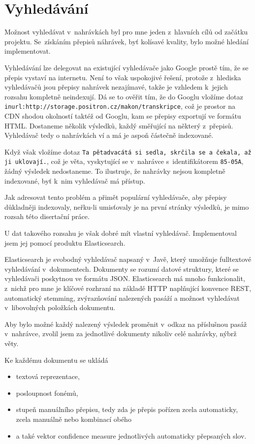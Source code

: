 \chapter{Vyhledávání}
\label{kap:vyhledavani}

Možnost vyhledávat v~nahrávkách byl pro mne jeden z~hlavních cílů od začátku
projektu. Se~získáním přepisů náhrávek, byť kolísavé kvality, bylo možné hledání
implementovat.

Vyhledávání lze delegovat na existující vyhledávače jako Google
prostě tím, že se přepis vystaví na internetu. Není to však uspokojivé řešení,
protože z~hlediska vyhledávačů jsou přepisy nahrávek nezajímavé, takže je
vzhledem k~jejich rozsahu kompletně neindexují. Dá se to ověřit tím, že do
Googlu vložíme dotaz
\texttt{inurl:http://storage.positron.cz/makon/transkripce}, což je prostor na
CDN shodou okolností taktéž od Googlu, kam se přepisy exportují ve formátu HTML.
Dostaneme několik výsledků, každý směřující na některý z~přepisů. Vyhledávač
tedy o nahrávkách ví a má je aspoň částečně indexované.

Když však vložíme dotaz \texttt{Ta pětadvacátá si sedla, skrčila se a čekala, až
ji uklovají.}, což je věta, vyskytující se v~nahrávce s~identifikátorem
\texttt{85-05A}, žádný výsledek nedostaneme. To ilustruje, že nahrávky nejsou
kompletně indexované, byť k~nim vyhledávač má přístup.

Jak adresovat tento problém a přimět populární vyhledávače, aby přepisy
důkladněji indexovaly, neřku-li umisťovaly je na první stránky výsledků, je mimo
rozsah této disertační práce.

U dat takového rozsahu je však dobré mít vlastní vyhledávač.
Implementoval jsem jej pomocí produktu Elasticsearch.

Elasticsearch je svobodný vyhledávač napsaný v~Javě, který umožňuje fulltextové
vyhledávání v~dokumentech. Dokumenty se rozumí datové struktury, které se
vyhledávači poskytnou ve formátu JSON. Elasticsearch má mnoho funkcionalit,
z~nichž pro mne je klíčové rozhraní na základě HTTP naplňující konvence REST,
automatický stemming, zvýrazňování nalezených pasáží a možnost vyhledávat
v~libovolných položkách dokumentu.

Aby bylo možné každý nalezený výsledek proměnit v~odkaz na příslušnou pasáž
v~nahrávce, zvolil jsem za jednotlivé dokumenty nikoliv celé nahrávky, nýbrž
věty.

Ke každému dokumentu se ukládá
\begin{itemize}
\item{textová reprezentace,}
\item{posloupnost fonémů,}
\item{stupeň
manuálního přepisu, tedy zda je přepis pořízen zcela automaticky, zcela manuálně
nebo kombinací obého}
\item{a také vektor confidence measure jednotlivých automaticky přepsaných slov.}
\end{itemize}

